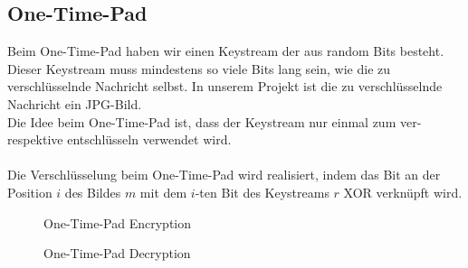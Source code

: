 \documentclass[paper=a4,fontsize=12pt]{scrartcl}
\begin{document}
\subsection{One-Time-Pad}
Beim One-Time-Pad haben wir einen Keystream der aus random Bits besteht.
Dieser Keystream muss mindestens so viele Bits lang sein, wie die zu verschlüsselnde Nachricht selbst.
In unserem Projekt ist die zu verschlüsselnde Nachricht ein JPG-Bild. \\
Die Idee beim One-Time-Pad ist, dass der Keystream nur einmal zum ver- respektive entschlüsseln verwendet wird. \\ \\
Die Verschlüsselung beim One-Time-Pad wird realisiert, 
indem das Bit an der Position $i$ des Bildes $m$ mit dem $i$-ten Bit des Keystreams $r$ XOR verknüpft wird.

\begin{figure}[H] 
	\centering
	\caption[One Time Pad Encryption]{One-Time-Pad Encryption}  
	\label{One-Time-Pad Encryption}  
\end{figure}
\begin{figure}[H] 
	\centering
	\caption[One Time Pad Decryption]{One-Time-Pad Decryption}  
	\label{One-Time-Pad Entschlüsselung} 
\end{figure}
\end{document}
